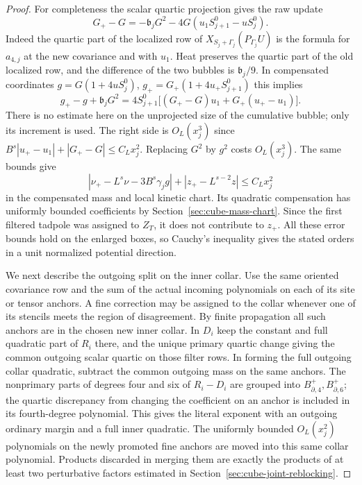 \documentclass[11pt]{article}
\theoremstyle{definition}
\begin{document}
\begin{proof}
For completeness the scalar quartic projection gives the raw update
\begin{equation}
 G_+-G=-\mathfrak b_jG^2-4G(u_1S_{j+1}^0-uS_j^0).
\end{equation}
Indeed the quartic part of the localized row of
\(X_{S_j+\Gamma_j}(P_{\Gamma_j}U)\) is the formula for \(a_{4,j}\)
at the new covariance and with \(u_1\). Heat preserves the quartic
part of the old localized row, and the difference of the two bubbles
is \(\mathfrak b_j/9\). In compensated coordinates
\(g=G(1+4uS_j^0)\), \(g_+=G_+(1+4u_+S_{j+1}^0)\) this implies
\begin{equation}
 g_+-g+\mathfrak b_jG^2
 =4S_{j+1}^0\bigl[(G_+-G)u_1+G_+(u_+-u_1)\bigr].
\end{equation}
There is no estimate here on the unprojected size of the cumulative
bubble; only its increment is used. The right side is \(O_L(x_j^3)\)
since \(B^s|u_+-u_1|+|G_+-G|\le C_Lx_j^2\).
Replacing \(G^2\) by \(g^2\) costs \(O_L(x_j^3)\).
The same bounds give
\begin{equation}
 |\nu_+-L^s\nu-3B^s\gamma_jg|
       +|z_+-L^{s-2}z|\le C_L x_j^2
\end{equation}
in the compensated mass and local kinetic chart. Its quadratic
compensation has uniformly bounded coefficients by
Section~\ref{sec:cube-mass-chart}. Since the first filtered tadpole
was assigned to \(Z_T\), it does not contribute to \(z_+\).
All these error bounds hold on the enlarged boxes, so Cauchy's
inequality gives the stated orders in a unit normalized potential
direction.

We next describe the outgoing split on the inner collar. Use the
same oriented covariance row and the sum of the actual incoming
polynomials on each of its site or tensor anchors. A fine
correction may be assigned to the collar whenever one of its
stencils meets the region of disagreement. By finite propagation
all such anchors are in the chosen new inner collar.
In \(D_i\) keep the constant and full quadratic part of \(R_i\)
there, and the unique primary quartic change giving the common
outgoing scalar quartic on those filter rows. In forming the full
outgoing collar quadratic, subtract the common outgoing mass on
the same anchors. The nonprimary parts of degrees four and six
of \(R_i-D_i\) are grouped into \(B_{\partial,4}^+,B_{\partial,6}^+\);
the quartic discrepancy from changing the coefficient on an
anchor is included in its fourth-degree polynomial.
This gives the literal exponent with an outgoing ordinary margin
and a full inner quadratic. The uniformly bounded \(O_L(x_j^2)\)
polynomials on the newly promoted fine anchors are moved into
this same collar polynomial. Products discarded in merging them
are exactly the products of at least two perturbative factors
estimated in Section~\ref{sec:cube-joint-reblocking}.


\end{proof}
\end{document}
